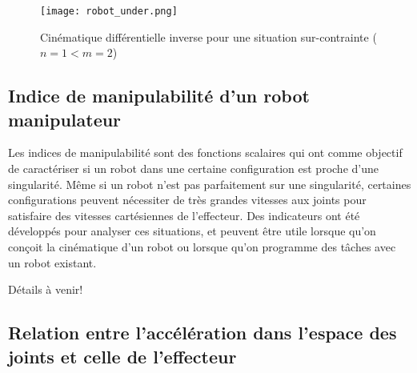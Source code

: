 \begin{example}
\begin{figure}[H]
	\centering
		\texttt{[image: robot\_under.png]}
	\caption{Cinématique différentielle inverse pour une situation sur-contrainte ($n=1<m=2$)}
	\label{fig:robot_under}
\end{figure}
\end{example}


\newpage
\subsection{Indice de manipulabilité d'un robot manipulateur}

Les indices de manipulabilité sont des fonctions scalaires qui ont comme objectif de caractériser si un robot dans une certaine configuration est proche d'une singularité. Même si un robot n'est pas parfaitement sur une singularité, certaines configurations peuvent nécessiter de très grandes vitesses aux joints pour satisfaire des vitesses cartésiennes de l'effecteur. Des indicateurs ont été développés pour analyser ces situations, et peuvent être utile lorsque qu'on conçoit la cinématique d'un robot ou lorsque qu'on programme des tâches avec un robot existant.

Détails à venir!



\newpage
\subsection{Relation entre l'accélération dans l'espace des joints et celle de l'effecteur}
\label{sec:accjointspace}


